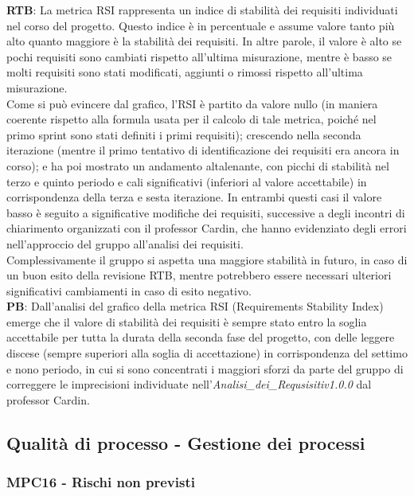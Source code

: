 \documentclass[10pt]{article}
\begin{document}
\begin{justify}
\textbf{RTB}: La metrica RSI rappresenta un indice di stabilità dei requisiti individuati nel corso del progetto. Questo indice è in percentuale e assume valore tanto più alto 
quanto maggiore è la stabilità dei requisiti. In altre parole, il valore è alto se pochi requisiti sono cambiati rispetto all'ultima misurazione, mentre è basso se molti requisiti sono
stati modificati, aggiunti o rimossi rispetto all'ultima misurazione.\\
Come si può evincere dal grafico, l'RSI è partito da valore nullo (in maniera coerente rispetto alla formula usata per il calcolo di tale metrica, poiché nel primo sprint 
sono stati definiti i primi requisiti); crescendo nella seconda iterazione (mentre il primo tentativo di identificazione dei requisiti era ancora in corso); e ha poi mostrato 
un andamento altalenante, con picchi di stabilità nel terzo e quinto periodo e cali significativi (inferiori al valore accettabile) in corrispondenza della terza e sesta iterazione. In entrambi questi 
casi il valore basso è seguito a significative modifiche dei requisiti, successive a degli incontri di chiarimento organizzati con il professor Cardin, che  hanno 
evidenziato degli errori nell'approccio del gruppo all'analisi dei requisiti.\\
Complessivamente il gruppo si aspetta una maggiore stabilità in futuro, in caso di un buon esito della revisione RTB, mentre potrebbero essere necessari ulteriori
significativi cambiamenti in caso di esito negativo.\\

\noindent
\textbf{PB}: Dall'analisi del grafico della metrica RSI (Requirements Stability Index) emerge che il valore di stabilità dei requisiti è sempre stato entro la soglia accettabile
per tutta la durata della seconda fase del progetto, con delle leggere discese (sempre superiori alla soglia di accettazione) in corrispondenza del settimo e nono periodo, in cui si sono
concentrati i maggiori sforzi da parte del gruppo di correggere le imprecisioni individuate nell'\textit{Analisi\_dei\_Requsisitiv1.0.0} dal professor Cardin.\\


\subsection{Qualità di processo - Gestione dei processi}
\subsubsection{MPC16 - Rischi non previsti}


\end{justify}
\end{document}
